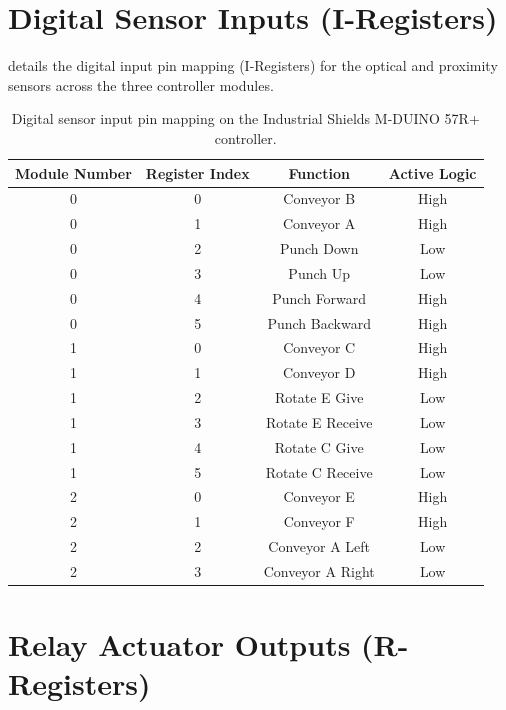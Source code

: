 \section{Digital Sensor Inputs (I-Registers)}

 details the digital input pin mapping (I-Registers) for the optical and proximity sensors across the three controller modules.

\begin{table}[htbp]
    \centering
    \caption{Digital sensor input pin mapping on the Industrial Shields M-DUINO 57R+ controller.}
    \label{tab:fms_sensor_inputs}
    \begin{tabular}{cccc}
        \toprule
        \textbf{Module Number} & \textbf{Register Index} & \textbf{Function} & \textbf{Active Logic} \\
        \midrule
        0 & 0 & Conveyor B & High \\
        0 & 1 & Conveyor A & High \\
        0 & 2 & Punch Down & Low \\
        0 & 3 & Punch Up & Low \\
        0 & 4 & Punch Forward & High \\
        0 & 5 & Punch Backward & High \\
        \midrule
        1 & 0 & Conveyor C & High \\
        1 & 1 & Conveyor D & High \\
        1 & 2 & Rotate E Give & Low \\
        1 & 3 & Rotate E Receive & Low \\
        1 & 4 & Rotate C Give & Low \\
        1 & 5 & Rotate C Receive & Low \\
        \midrule
        2 & 0 & Conveyor E & High \\
        2 & 1 & Conveyor F & High \\
        2 & 2 & Conveyor A Left & Low \\
        2 & 3 & Conveyor A Right & Low \\
        \bottomrule
    \end{tabular}
\end{table}

\section{Relay Actuator Outputs (R-Registers)}

